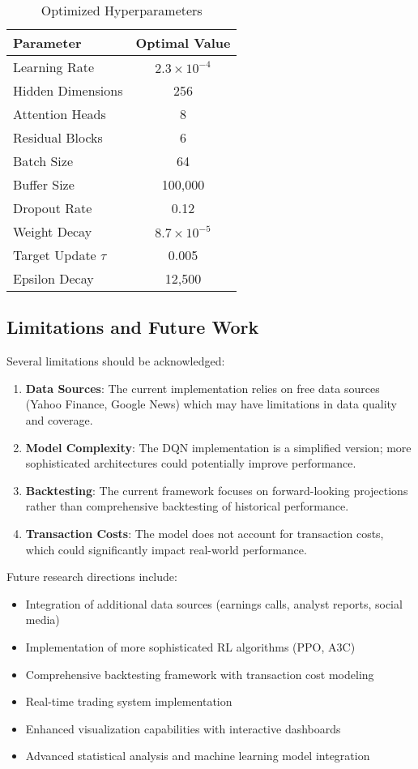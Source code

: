 \documentclass[12pt,a4paper]{article}
\begin{document}
\begin{table}[H]
\centering
\caption{Optimized Hyperparameters}
\begin{tabular}{@{}lc@{}}
\toprule
Parameter & Optimal Value \\
\midrule
Learning Rate & $2.3 \times 10^{-4}$ \\
Hidden Dimensions & 256 \\
Attention Heads & 8 \\
Residual Blocks & 6 \\
Batch Size & 64 \\
Buffer Size & 100,000 \\
Dropout Rate & 0.12 \\
Weight Decay & $8.7 \times 10^{-5}$ \\
Target Update $\tau$ & 0.005 \\
Epsilon Decay & 12,500 \\
\bottomrule
\end{tabular}
\end{table}

\subsection{Limitations and Future Work}

Several limitations should be acknowledged:

\begin{enumerate}
\item \textbf{Data Sources}: The current implementation relies on free data sources (Yahoo Finance, Google News) which may have limitations in data quality and coverage.

\item \textbf{Model Complexity}: The DQN implementation is a simplified version; more sophisticated architectures could potentially improve performance.

\item \textbf{Backtesting}: The current framework focuses on forward-looking projections rather than comprehensive backtesting of historical performance.

\item \textbf{Transaction Costs}: The model does not account for transaction costs, which could significantly impact real-world performance.
\end{enumerate}

Future research directions include:
\begin{itemize}
\item Integration of additional data sources (earnings calls, analyst reports, social media)
\item Implementation of more sophisticated RL algorithms (PPO, A3C)
\item Comprehensive backtesting framework with transaction cost modeling
\item Real-time trading system implementation
\item Enhanced visualization capabilities with interactive dashboards
\item Advanced statistical analysis and machine learning model integration
\end{itemize}
\end{document}
